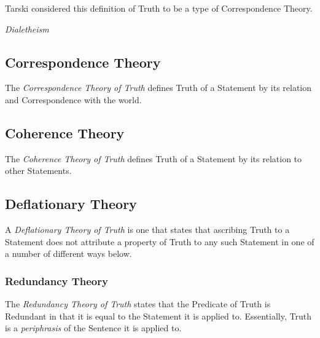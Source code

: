 \documentclass{article}
\begin{document}
Tarski considered this definition of Truth to be a type of
Correspondence Theory.

\emph{Dialetheism}

\subsection{Correspondence Theory}\label{subsec:correspondence_truth}

The \emph{Correspondence Theory of Truth} defines Truth of a Statement
by its relation and Correspondence with the world.

\subsection{Coherence Theory}

The \emph{Coherence Theory of Truth} defines Truth of a Statement by
its relation to other Statements.

\subsection{Deflationary Theory}\label{subsec:deflationary_truth}

A \emph{Deflationary Theory of Truth} is one that states that
ascribing Truth to a Statement does not attribute a property of Truth
to any such Statement in one of a number of different ways below.

\subsubsection{Redundancy Theory}

The \emph{Redundancy Theory of Truth} states that the Predicate of
Truth is Redundant in that it is equal to the Statement it is applied
to.\cite{ramsey27} Essentially, Truth is a \emph{periphrasis} of the
Sentence it is applied to.

\end{document}
